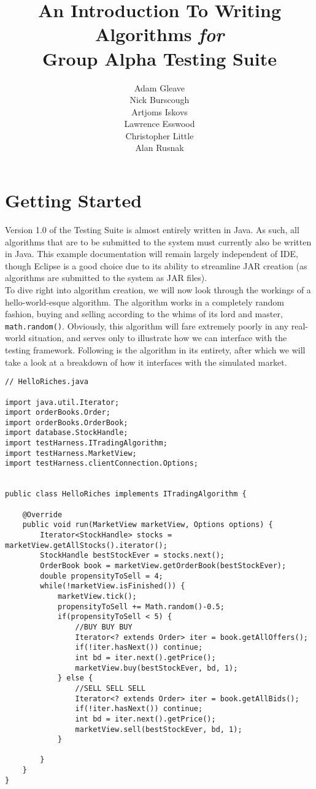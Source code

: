 \documentclass[11pt]{article}
\title{\textbf{An Introduction To Writing Algorithms \emph{for}\\Group Alpha Testing Suite}}
\author{Adam Gleave\\
		Nick Burscough\\
		Artjoms Iskovs\\
		Lawrence Esswood\\
		Christopher Little\\
		Alan Rusnak}
\date{}
\begin{document}
\maketitle

\section{Getting Started}

Version 1.0 of the Testing Suite is almost entirely written in Java. As such, all algorithms that are to be submitted to the system must currently also be written in Java. This example documentation will remain largely independent of IDE, though Eclipse is a good choice due to its ability to streamline JAR creation (as algorithms are submitted to the system as JAR files).\\
To dive right into algorithm creation, we will now look through the workings of a hello-world-esque algorithm. The algorithm works in a completely random fashion, buying and selling according to the whims of its lord and master, \texttt{math.random()}. Obviously, this algorithm will fare extremely poorly in any real-world situation, and serves only to illustrate how we can interface with the testing framework. Following is the algorithm in its entirety, after which we will take a look at a breakdown of how it interfaces with the simulated market.\newpage

\begin{lstlisting}
// HelloRiches.java

import java.util.Iterator;
import orderBooks.Order;
import orderBooks.OrderBook;
import database.StockHandle;
import testHarness.ITradingAlgorithm;
import testHarness.MarketView;
import testHarness.clientConnection.Options;


public class HelloRiches implements ITradingAlgorithm {

	@Override
	public void run(MarketView marketView, Options options) {
		Iterator<StockHandle> stocks = marketView.getAllStocks().iterator();
		StockHandle bestStockEver = stocks.next();
		OrderBook book = marketView.getOrderBook(bestStockEver);
		double propensityToSell = 4;
		while(!marketView.isFinished()) {
			marketView.tick();
			propensityToSell += Math.random()-0.5;
			if(propensityToSell < 5) {
				//BUY BUY BUY
				Iterator<? extends Order> iter = book.getAllOffers();
				if(!iter.hasNext()) continue;
				int bd = iter.next().getPrice();
				marketView.buy(bestStockEver, bd, 1);
			} else {
				//SELL SELL SELL
				Iterator<? extends Order> iter = book.getAllBids();
				if(!iter.hasNext()) continue;
				int bd = iter.next().getPrice();
				marketView.sell(bestStockEver, bd, 1);
			}
			
		}
	}
}

\end{lstlisting}
\end{document}
